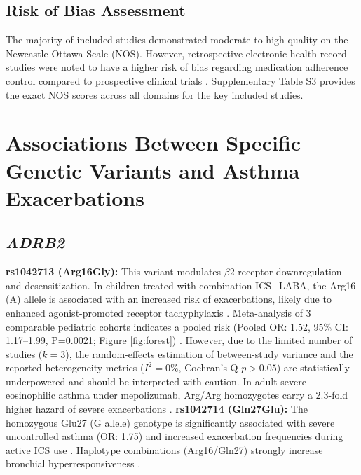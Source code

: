 \documentclass[11pt,a4paper]{article}
\begin{document}
\subsection{Risk of Bias Assessment}
The majority of included studies demonstrated moderate to high quality on the Newcastle-Ottawa Scale (NOS). However, retrospective electronic health record studies were noted to have a higher risk of bias regarding medication adherence control compared to prospective clinical trials \cite{McGeachieWu2015, SoodConnolly2018}. Supplementary Table S3 provides the exact NOS scores across all domains for the key included studies.

\section{Associations Between Specific Genetic Variants and Asthma Exacerbations}

\subsection{\textit{ADRB2}}
\textbf{rs1042713 (Arg16Gly):} This variant modulates $\beta2$-receptor downregulation and desensitization. In children treated with combination ICS+LABA, the Arg16 (A) allele is associated with an increased risk of exacerbations, likely due to enhanced agonist-promoted receptor tachyphylaxis \cite{TurnerFrancis2016, SlobRichards2021}. Meta-analysis of 3 comparable pediatric cohorts indicates a pooled risk (Pooled OR: 1.52, 95\% CI: 1.17–1.99, P=0.0021; Figure \ref{fig:forest}) \cite{TurnerFrancis2016}. However, due to the limited number of studies ($k=3$), the random-effects estimation of between-study variance and the reported heterogeneity metrics ($I^2 = 0\%$, Cochran's Q $p > 0.05$) are statistically underpowered and should be interpreted with caution. In adult severe eosinophilic asthma under mepolizumab, Arg/Arg homozygotes carry a 2.3-fold higher hazard of severe exacerbations \cite{NolascoFagone2025}.
\textbf{rs1042714 (Gln27Glu):} The homozygous Glu27 (G allele) genotype is significantly associated with severe uncontrolled asthma (OR: 1.75) and increased exacerbation frequencies during active ICS use \cite{RodriguesFilho2025, SoodConnolly2018}. Haplotype combinations (Arg16/Gln27) strongly increase bronchial hyperresponsiveness \cite{KarimiVijverberg2021}.
\end{document}
